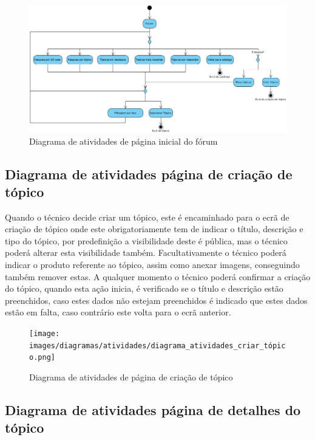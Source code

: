 \begin{figure}[htb]
    \centering
    \includegraphics[width=\textwidth]{images/diagramas/atividades/diagrama_atividades_forum.png}
    \caption{Diagrama de atividades de página inicial do fórum}
    \label{fig:22}
\end{figure}

\newpage

\subsection{Diagrama de atividades página de criação de tópico}

Quando o técnico decide criar um tópico, este é encaminhado para o ecrã de criação de tópico 
onde este obrigatoriamente tem de indicar o título, descrição e tipo do tópico, por predefinição a 
visibilidade deste é pública, mas o técnico poderá alterar esta visibilidade também. 
Facultativamente o técnico poderá indicar o produto referente ao tópico, 
assim como anexar imagens, conseguindo também remover estas. A qualquer momento o técnico poderá 
confirmar a criação do tópico, quando esta ação inicia, é verificado se o título e descrição estão 
preenchidos, caso estes dados não estejam preenchidos é indicado que estes dados estão em falta, 
caso contrário este volta para o ecrã anterior.

\begin{figure}[htb]
    \centering
    \texttt{[image: images/diagramas/atividades/diagrama\_atividades\_criar\_tópico.png]}
    \caption{Diagrama de atividades de página de criação de tópico}
    \label{fig:24}
\end{figure}

\newpage

\subsection{Diagrama de atividades página de detalhes do tópico}

